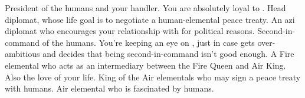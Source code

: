 \documentclass[char]{elementals}
\begin{document}
\begin{contacts}
  \contact{\cLeader{}} President of the humans and your handler.  You are absolutely loyal to .
  \contact{\cAvatar{}} Head diplomat, whose life goal is to negotiate a human-elemental peace treaty.
  \contact{\cDiplomat{}} An azi diplomat who encourages your relationship with \cJuliet{} for political reasons.
  \contact{\cDema{}} Second-in-command of the humans.  You're keeping an eye on \cDema{\them}, just in case  gets over-ambitious and decides that being second-in-command isn't good enough.
  \contact{\cJuliet{}} A Fire elemental who acts as an intermediary between the Fire Queen and Air King.  Also the love of your life.
  \contact{\cKing{}} King of the Air elementals who may sign a peace treaty with humans.
  \contact{\cNaturalist{}} Air elemental who is fascinated by humans.
\end{contacts}
\end{document}
